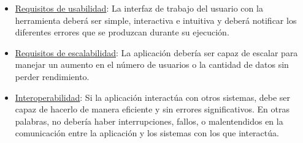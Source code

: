 \begin{itemize}
    \item \underline{Requisitos de usabilidad}: La interfaz de trabajo del usuario con la herramienta deberá ser simple, interactiva e intuitiva y deberá notificar los diferentes errores que se produzcan durante su ejecución.
    \item \underline{Requisitos de escalabilidad}: La aplicación debería ser capaz de escalar para manejar un aumento en el número de usuarios o la cantidad de datos sin perder rendimiento.     
    \item \underline{Interoperabilidad}: Si la aplicación interactúa con otros sistemas, debe ser capaz de hacerlo de manera eficiente y sin errores significativos. En otras palabras, no debería haber interrupciones, fallos, o malentendidos en la comunicación entre la aplicación y los sistemas con los que interactúa.
\end{itemize}

